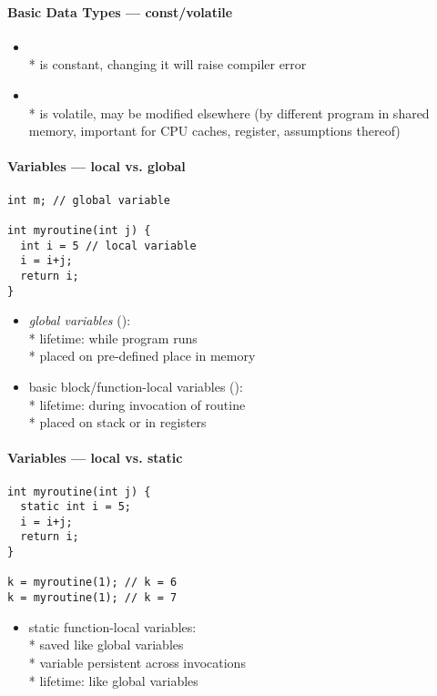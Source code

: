 \paragraph{Basic Data Types --- const/volatile}
\begin{itemize}
  \item {} \\*
     is constant, changing it will raise compiler error
  \item {} \\*
     is volatile, may be modified elsewhere (by different program in shared memory, important for CPU caches, register, assumptions thereof)
\end{itemize}

\paragraph{Variables --- local vs. global}
\begin{lstlisting}[style=customc]
int m; // global variable

int myroutine(int j) {
  int i = 5 // local variable
  i = i+j;
  return i;
}
\end{lstlisting}
\begin{itemize}
  \item \emph{global variables} (): \\*
    lifetime: while program runs \\*
    placed on pre-defined place in memory
  \item basic block/function-local variables (): \\*
    lifetime: during invocation of routine \\*
    placed on stack or in registers
\end{itemize}

\paragraph{Variables --- local vs. static}
\begin{lstlisting}[style=customc]
int myroutine(int j) {
  static int i = 5;
  i = i+j;
  return i;
}

k = myroutine(1); // k = 6
k = myroutine(1); // k = 7
\end{lstlisting}
\begin{itemize}
  \item static function-local variables: \\*
    saved like global variables \\*
    variable persistent across invocations \\*
    lifetime: like global variables
\end{itemize}

